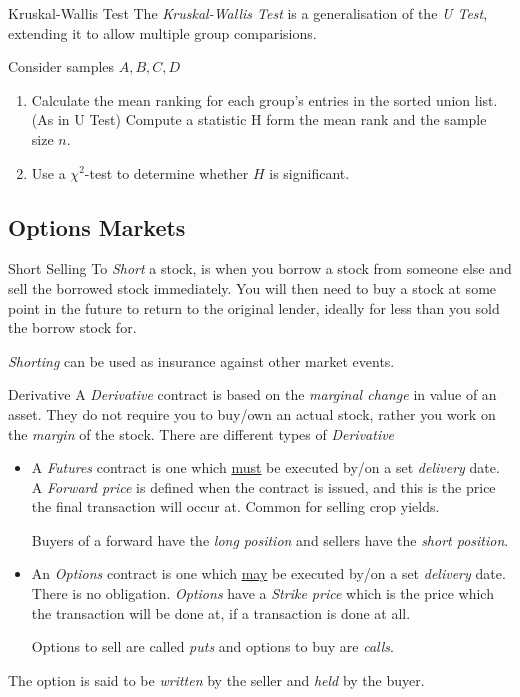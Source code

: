 \documentclass[11pt,a4paper]{article}
\begin{document}
  \begin{definition}{Kruskal-Wallis Test}
    The \textit{Kruskal-Wallis Test} is a generalisation of the \textit{U Test}, extending it to allow multiple group comparisions.
    \par Consider samples $A,B,C,D$
    \begin{enumerate}
      \item Calculate the mean ranking for each group's entries in the sorted union list. (As in U Test)
      \itme Compute a statistic H form the mean rank and the sample size $n$.
      \item Use a $\chi^2$-test to determine whether $H$ is significant.
    \end{enumerate}
  \end{definition}

\subsection{Options Markets}

  \begin{definition}{Short Selling}
    To \textit{Short} a stock, is when you borrow a stock from someone else and sell the borrowed stock immediately. You will then need to buy a stock at some point in the future to return to the original lender, ideally for less than you sold the borrow stock for.
    \par \textit{Shorting} can be used as insurance against other market events.
  \end{definition}

  \begin{definition}{Derivative}
    A \textit{Derivative} contract is based on the \textit{marginal change} in value of an asset. They do not require you to buy/own an actual stock, rather you work on the \textit{margin} of the stock. There are different types of \textit{Derivative}
    \begin{itemize}
      \item A \textit{Futures} contract is one which \underline{must} be executed by/on a set \textit{delivery} date. A \textit{Forward price} is defined when the contract is issued, and this is the price the final transaction will occur at. Common for selling crop yields.
      \par Buyers of a forward have the \textit{long position} and sellers have the \textit{short position}.
      \item An \textit{Options} contract is one which \underline{may} be executed by/on a set \textit{delivery} date. There is no obligation. \textit{Options} have a \textit{Strike price} which is the price which the transaction will be done at, if a transaction is done at all.
      \par Options to sell are called \textit{puts} and options to buy are \textit{calls}.
    \end{itemize}
    The option is said to be \textit{written} by the seller and \textit{held} by the buyer.
  \end{definition}
\end{document}

